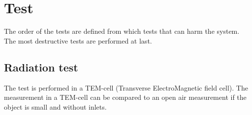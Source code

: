 \chapter{Test}


The order of the tests are defined from which tests that can harm the system. The most destructive tests are performed at last. 
\section{Radiation test}
The test is performed in a TEM-cell (Transverse ElectroMagnetic field cell).
The measurement in a TEM-cell can be compared to an open air measurement if the object is small and without inlets. 

